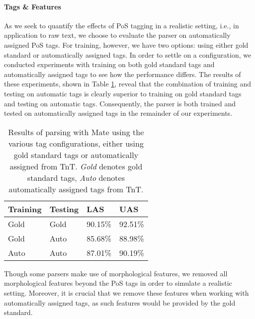 \documentclass[11pt,a4paper]{article}
\begin{document}
\paragraph{Tags \& Features} %
As we seek to quantify the effects of PoS tagging in a realistic setting, i.e.,
in application to raw text, we choose to evaluate the parser on automatically
assigned PoS tags. For training, however, we have two options: using either
gold standard or automatically assigned tags. In order to settle on a
configuration, we conducted experiments with training on both gold standard
tags and automatically assigned tags to see how the performance differs. The
results of these experiments, shown in Table \ref{tagconfigeval}, reveal that
the combination of training and testing on automatic tags is clearly superior
to training on gold standard tags and testing on automatic tags. Consequently,
the parser is both trained and tested on automatically assigned tags in the
remainder of our experiments.

\begin{table}
    \centering
    \smaller[0.5]
    \begin{tabular}{@{}llll@{}}
        \toprule
        \textbf{Training} & \textbf{Testing} & \textbf{LAS} & \textbf{UAS} \\
        \midrule
        Gold & Gold & 90.15\% & 92.51\% \\
        Gold & Auto & 85.68\% & 88.98\% \\
        Auto & Auto & 87.01\% & 90.19\% \\
        \bottomrule
    \end{tabular}
    \caption{Results of parsing with Mate using the various tag configurations,
        either using gold standard tags or automatically assigned from TnT.
        \emph{Gold} denotes gold standard tags, \emph{Auto} denotes
        automatically assigned tags from TnT.}
    \label{tagconfigeval}
\end{table}

Though some parsers make use of morphological features, %
we removed all morphological features beyond the PoS tags in order to simulate
a realistic setting.  Moreover, it is crucial that we remove these features
when working with automatically assigned tags, as such features would be
provided by the gold standard.

\end{document}
